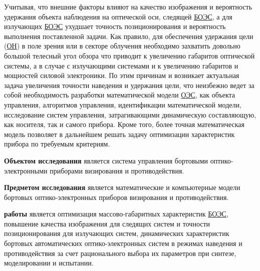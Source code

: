 Учитывая, что внешние факторы влияют на качество изображения и вероятность удержания объекта наблюдения на оптической оси, следящей  \hyperref[acroAEOS]{БОЭС}, а для излучающих \hyperref[acroAEOS]{БОЭС} ухудшает точность позиционирования и вероятность выполнения поставленной задачи.  Как правило, для обеспечения удержания цели (\hyperref[acroON]{ОН}) в поле зрения или в секторе облучения необходимо захватить довольно большой телесный угол обзора что приводит к увеличению габаритов оптической системы, а в случае с излучающими системами и к увеличению габаритов и мощностей силовой электроники. По этим причинам и возникает актуальная задача увеличения точности наведения и удержания цели, что неизбежно ведет за собой необходимость разработки математической модели \hyperref[acroEOS]{ОЭС}, как объекта управления, алгоритмов управления, идентификации математической модели, исследование систем управления, затрагивающими динамическую составляющую, как носителя, так и самого прибора. Кроме того, более точная математическая модель позволяет в дальнейшем решать задачу оптимизации характеристик прибора по требуемым критериям.

\begin{comment}
\ifsynopsis
Этот абзац появляется только в~автореферате.
\else

\fi
\end{comment}


\textbf{Объектом исследования} является система управления бортовыми оптико-электронными приборами визирования и противодействия.

\textbf{Предметом исследования} является математические и компьютерные модели бортовых оптико-электронных приборов визирования и противодействия.

{\aim} \textbf{работы} является оптимизация массово-габаритных характеристик \hyperref[acroAEOS]{БОЭС}, повышение качества изображения для следящих систем и точности позиционирования для излучающих систем, динамических характеристик бортовых автоматических оптико-электронных систем в режимах наведения и противодействия за счет рационального выбора их параметров при синтезе, моделировании и испытании.

